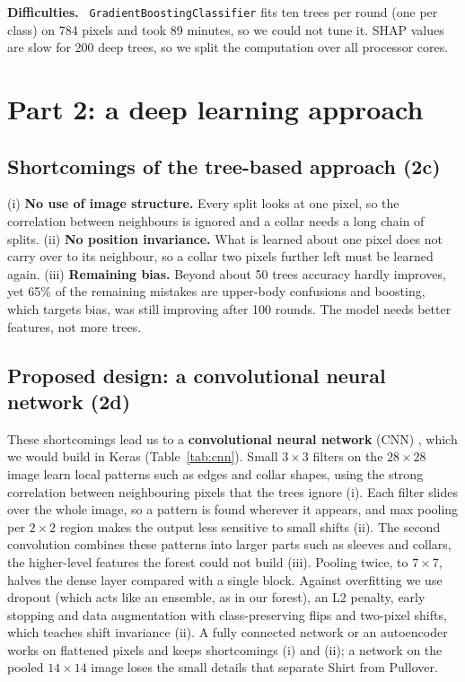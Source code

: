 \documentclass[11pt,a4paper]{article}
\newcommand{\pkg}[1]{\texttt{#1}}
\newcommand{\para}[1]{\textbf{#1}\ }
\begin{document}
\para{Difficulties.} \pkg{GradientBoostingClassifier} fits ten trees per round (one per class) on 784 pixels and took 89 minutes, so we could not tune it. SHAP values are slow for 200 deep trees, so we split the computation over all processor cores.

\section{Part 2: a deep learning approach}
\subsection{Shortcomings of the tree-based approach (2c)}
(i) \textbf{No use of image structure.} Every split looks at one pixel, so the correlation between neighbours is ignored and a collar needs a long chain of splits. (ii) \textbf{No position invariance.} What is learned about one pixel does not carry over to its neighbour, so a collar two pixels further left must be learned again. (iii) \textbf{Remaining bias.} Beyond about 50 trees accuracy hardly improves, yet 65\% of the remaining mistakes are upper-body confusions and boosting, which targets bias, was still improving after 100 rounds. The model needs better features, not more trees.

\subsection{Proposed design: a convolutional neural network (2d)}
These shortcomings lead us to a \textbf{convolutional neural network} (CNN) \citep{lecun1998}, which we would build in Keras (Table~\ref{tab:cnn}). Small $3\times3$ filters on the $28\times28$ image learn local patterns such as edges and collar shapes, using the strong correlation between neighbouring pixels that the trees ignore (i). Each filter slides over the whole image, so a pattern is found wherever it appears, and max pooling per $2\times2$ region makes the output less sensitive to small shifts (ii). The second convolution combines these patterns into larger parts such as sleeves and collars, the higher-level features the forest could not build (iii). Pooling twice, to $7\times7$, halves the dense layer compared with a single block. Against overfitting we use dropout (which acts like an ensemble, as in our forest), an L2 penalty, early stopping and data augmentation with class-preserving flips and two-pixel shifts, which teaches shift invariance (ii). A fully connected network or an autoencoder works on flattened pixels and keeps shortcomings (i) and (ii); a network on the pooled $14\times14$ image loses the small details that separate Shirt from Pullover.
\end{document}
